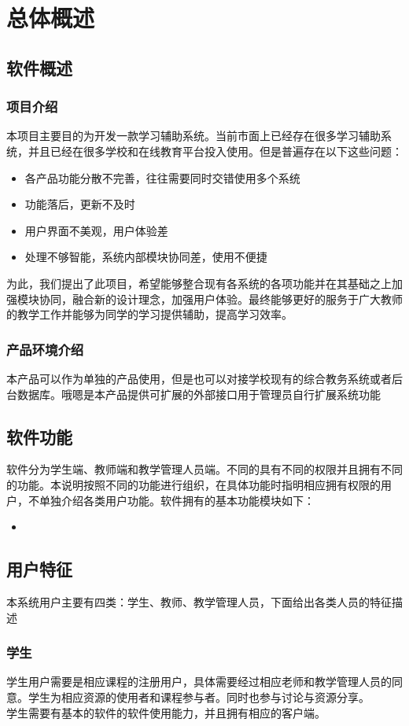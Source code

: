 \chapter{总体概述}
\section{软件概述}
\subsection{项目介绍}
本项目主要目的为开发一款学习辅助系统。当前市面上已经存在很多学习辅助系统，并且已经在很多学校和在线教育平台投入使用。但是普遍存在以下这些问题：\\
\begin{itemize}
  \item 各产品功能分散不完善，往往需要同时交错使用多个系统
  \item 功能落后，更新不及时
  \item 用户界面不美观，用户体验差
  \item 处理不够智能，系统内部模块协同差，使用不便捷
\end{itemize}
为此，我们提出了此项目，希望能够整合现有各系统的各项功能并在其基础之上加强模块协同，融合新的设计理念，加强用户体验。最终能够更好的服务于广大教师的教学工作并能够为同学的学习提供辅助，提高学习效率。

\subsection{产品环境介绍}
本产品可以作为单独的产品使用，但是也可以对接学校现有的综合教务系统或者后台数据库。哦嗯是本产品提供可扩展的外部接口用于管理员自行扩展系统功能

\section{软件功能}
软件分为学生端、教师端和教学管理人员端。不同的具有不同的权限并且拥有不同的功能。本说明按照不同的功能进行组织，在具体功能时指明相应拥有权限的用户，不单独介绍各类用户功能。软件拥有的基本功能模块如下：
\begin{itemize}
  \item
\end{itemize}
\section{用户特征}
本系统用户主要有四类：学生、教师、教学管理人员，下面给出各类人员的特征描述
\subsection{学生}
学生用户需要是相应课程的注册用户，具体需要经过相应老师和教学管理人员的同意。学生为相应资源的使用者和课程参与者。同时也参与讨论与资源分享。\\
学生需要有基本的软件的软件使用能力，并且拥有相应的客户端。
